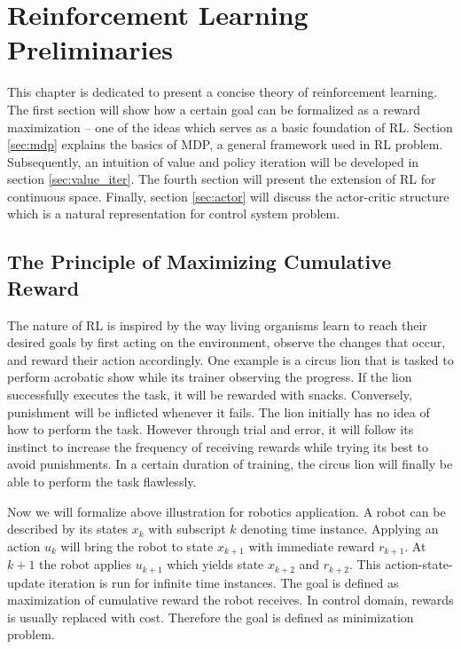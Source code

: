 \chapter{Reinforcement Learning Preliminaries}
This chapter is dedicated to present a concise theory of reinforcement learning. The first section will show how a certain goal can be formalized as a reward maximization -- one of the ideas which serves as a basic foundation of \ac{RL}. Section \ref{sec:mdp} explains the basics of \ac{MDP}, a general framework used in \ac{RL} problem. Subsequently, an intuition of value and policy iteration will be developed in section \ref{sec:value_iter}. The fourth section will present the extension of \ac{RL} for continuous space. Finally, section \ref{sec:actor} will discuss the actor-critic structure which is a natural representation for control system problem.

\section{The Principle of Maximizing Cumulative Reward}
The nature of \ac{RL} is inspired by the way living organisms learn to reach their desired goals by first acting on the environment, observe the changes that occur, and reward their action accordingly. One example is a circus lion that is tasked to perform acrobatic show while its trainer observing the progress. If the lion successfully executes the task, it will be rewarded with snacks. Conversely, punishment will be inflicted whenever it fails. The lion initially has no idea of how to perform the task. However through trial and error, it will follow its instinct to increase the frequency of receiving rewards while trying its best to avoid punishments. In a certain duration of training, the circus lion will finally be able to perform the task flawlessly. 

Now we will formalize above illustration for robotics application. A robot can be described by its states $x_k$ with subscript $k$ denoting time instance. Applying an action $u_k$ will bring the robot to state $x_{k+1}$ with immediate reward $r_{k+1}$. At $k+1$ the robot applies $u_{k+1}$ which yields state $x_{k+2}$ and $r_{k+2}$. This action-state-update iteration is run for infinite time instances. The goal is defined as maximization of cumulative reward the robot receives. In control domain, rewards is usually replaced with cost. Therefore the goal is defined as minimization problem.

